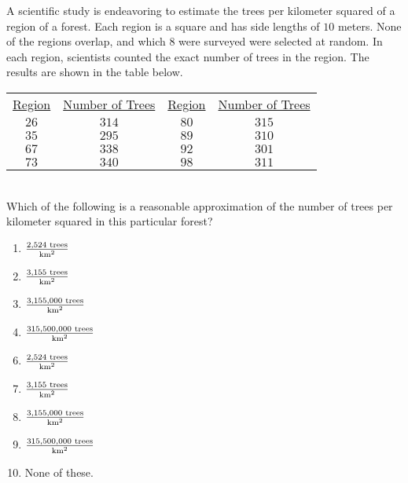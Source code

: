 
A scientific study is endeavoring to estimate the trees per kilometer squared of a region of a forest.  Each region is a square and has side lengths of $10$ meters.  None of the regions overlap, and which $8$ were surveyed were selected at random.  In each region, scientists counted the exact number of trees in the region.  The results are shown in the table below.\vspace{2mm}\\
\begin{tabular}{cc|cc}
\underline{Region}&\underline{Number of Trees}& \underline{Region} & \underline{Number of Trees}\\
$26$ & $314$ & $80$ & $315$ \\
$35$ & $295$ & $89$ & $310$ \\
$67$ & $338$ & $92$ & $301$ \\
$73$ & $340$ & $98$ & $311$ 
\end{tabular}\vspace{2mm}\\
Which of the following is a reasonable approximation of the number of trees per kilometer squared in this particular forest?


\ifsat
	\begin{enumerate}[label=\Alph*)]
		\item $\frac{2,524\rule{1mm}{0mm}\mathrm{trees}}{\rule{0mm}{2.2mm}\mathrm{km}^2}$ 
		\item $\frac{3,155\rule{1mm}{0mm}\mathrm{trees}}{\rule{0mm}{2.2mm}\mathrm{km}^2}$ 
		\item $\frac{3,155,000\rule{1mm}{0mm}\mathrm{trees}}{\rule{0mm}{2.2mm}\mathrm{km}^2}$ %
		\item $\frac{315,500,000\rule{1mm}{0mm}\mathrm{trees}}{\rule{0mm}{2.2mm}\mathrm{km}^2}$
	\end{enumerate}
\else
\fi

\ifacteven
	\begin{enumerate}[label=\textbf{\Alph*.},itemsep=\fill,align=left]
		\setcounter{enumii}{5}
		\item $\frac{2,524\rule{1mm}{0mm}\mathrm{trees}}{\rule{0mm}{2.2mm}\mathrm{km}^2}$ 
		\item $\frac{3,155\rule{1mm}{0mm}\mathrm{trees}}{\rule{0mm}{2.2mm}\mathrm{km}^2}$ 
		\item $\frac{3,155,000\rule{1mm}{0mm}\mathrm{trees}}{\rule{0mm}{2.2mm}\mathrm{km}^2}$ %
		\addtocounter{enumii}{1}
		\item $\frac{315,500,000\rule{1mm}{0mm}\mathrm{trees}}{\rule{0mm}{2.2mm}\mathrm{km}^2}$
		\item None of these. 
	\end{enumerate}
\else
\fi

